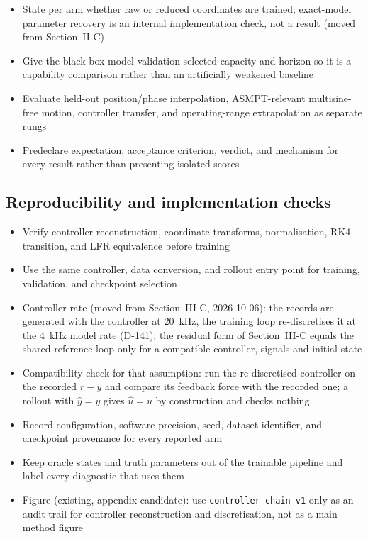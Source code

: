 \begin{itemize}
\item State per arm whether raw or reduced coordinates are trained; exact-model parameter recovery is an internal implementation check, not a result (moved from Section~II-C)
\item Give the black-box model validation-selected capacity and horizon so it is a capability comparison rather than an artificially weakened baseline
\item Evaluate held-out position/phase interpolation, ASMPT-relevant multisine-free motion, controller transfer, and operating-range extrapolation as separate rungs
\item Predeclare expectation, acceptance criterion, verdict, and mechanism for every result rather than presenting isolated scores
\end{itemize}

\subsection{Reproducibility and implementation checks}
\begin{itemize}
\item Verify controller reconstruction, coordinate transforms, normalisation, RK4 transition, and LFR equivalence before training
\item Use the same controller, data conversion, and rollout entry point for training, validation, and checkpoint selection
\item Controller rate (moved from Section~III-C, 2026-10-06): the records are generated with the controller at 20~kHz, the training loop re-discretises it at the 4~kHz model rate (D-141); the residual form of Section~III-C equals the shared-reference loop only for a compatible controller, signals and initial state
\item Compatibility check for that assumption: run the re-discretised controller on the recorded $r-y$ and compare its feedback force with the recorded one; a rollout with $\hat y=y$ gives $\hat u=u$ by construction and checks nothing
\item Record configuration, software precision, seed, dataset identifier, and checkpoint provenance for every reported arm
\item Keep oracle states and truth parameters out of the trainable pipeline and label every diagnostic that uses them
\item Figure (existing, appendix candidate): use \texttt{controller-chain-v1} only as an audit trail for controller reconstruction and discretisation, not as a main method figure
\end{itemize}

